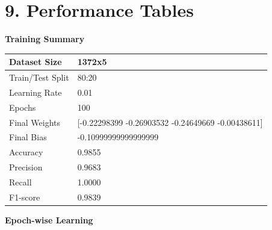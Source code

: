 \documentclass[11pt]{article}
\begin{document}
\vspace{10mm}
\section*{9. Performance Tables}

\textbf{Training Summary}\\

\begin{tabular}{|p{6cm}|p{7cm}|}
\hline
Dataset Size &1372x5\\
\hline
Train/Test Split &80:20\\
\hline
Learning Rate &0.01\\
\hline
Epochs &100\\
\hline
Final Weights &[-0.22298399 -0.26903532 -0.24649669 -0.00438611]\\
\hline
Final Bias &-0.10999999999999999\\
\hline
Accuracy &0.9855\\
\hline
Precision &0.9683\\
\hline
Recall &1.0000\\
\hline
F1-score &0.9839\\
\hline
\end{tabular}

\vspace{3mm}
\clearpage
\textbf{Epoch-wise Learning}
\end{document}
